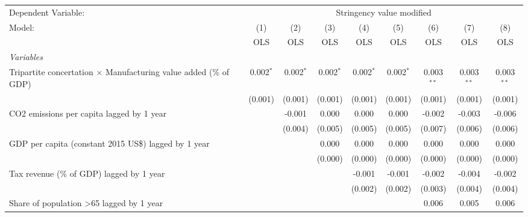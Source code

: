 
\begingroup
\centering
\begin{tabular}{lcccccccc}
   \toprule
   Dependent Variable: & \multicolumn{8}{c}{Stringency value modified}\\
   Model:                                                                   & (1)         & (2)         & (3)         & (4)         & (5)         & (6)          & (7)          & (8)\\  
                                                                            &  OLS        & OLS         & OLS         & OLS         & OLS         & OLS          & OLS          & OLS\\  
   \midrule
   \emph{Variables}\\
   Tripartite concertation $\times$ Manufacturing value added (\% of GDP)   & 0.002$^{*}$ & 0.002$^{*}$ & 0.002$^{*}$ & 0.002$^{*}$ & 0.002$^{*}$ & 0.003$^{**}$ & 0.003$^{**}$ & 0.003$^{**}$\\   
                                                                            & (0.001)     & (0.001)     & (0.001)     & (0.001)     & (0.001)     & (0.001)      & (0.001)      & (0.001)\\   
   CO2 emissions per capita lagged by 1 year                                &             & -0.001      & 0.000       & 0.000       & 0.000       & -0.002       & -0.003       & -0.006\\   
                                                                            &             & (0.004)     & (0.005)     & (0.005)     & (0.005)     & (0.007)      & (0.006)      & (0.006)\\   
   GDP per capita (constant 2015 US\$) lagged by 1 year                     &             &             & 0.000       & 0.000       & 0.000       & 0.000        & 0.000        & 0.000\\   
                                                                            &             &             & (0.000)     & (0.000)     & (0.000)     & (0.000)      & (0.000)      & (0.000)\\   
   Tax revenue (\% of GDP) lagged by 1 year                                 &             &             &             & -0.001      & -0.001      & -0.002       & -0.004       & -0.002\\   
                                                                            &             &             &             & (0.002)     & (0.002)     & (0.003)      & (0.004)      & (0.004)\\   
   Share of population >65 lagged by 1 year                                 &             &             &             &             &             & 0.006        & 0.005        & 0.006\\   

\end{tabular}
